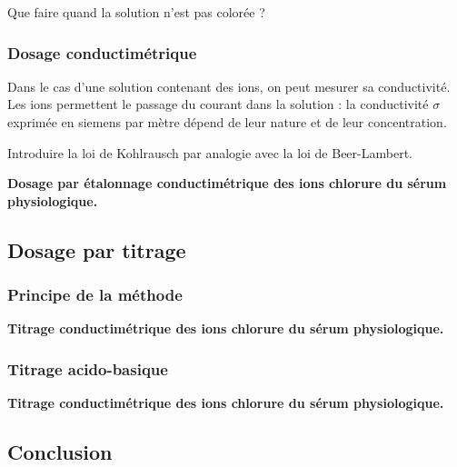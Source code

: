 \begin{transition}
Que faire quand la solution n'est pas colorée ?
\end{transition}

\subsubsection{Dosage conductimétrique}

Dans le cas d'une solution contenant des ions, on peut mesurer sa conductivité. 
Les ions permettent le passage du courant dans la solution : la conductivité $\sigma$ exprimée en siemens par mètre dépend de leur nature et de leur concentration.

Introduire la loi de Kohlrausch par analogie avec la loi de Beer-Lambert.

\begin{experience}
\textbf{Dosage par étalonnage conductimétrique des ions chlorure du sérum physiologique.}
\end{experience}

\subsection{Dosage par titrage}

\subsubsection{Principe de la méthode}

\begin{experience}
\textbf{Titrage conductimétrique des ions chlorure du sérum physiologique.}
\end{experience}

\subsubsection{Titrage acido-basique}

\begin{experience}
\textbf{Titrage conductimétrique des ions chlorure du sérum physiologique.}
\end{experience}

\subsection{Conclusion}

